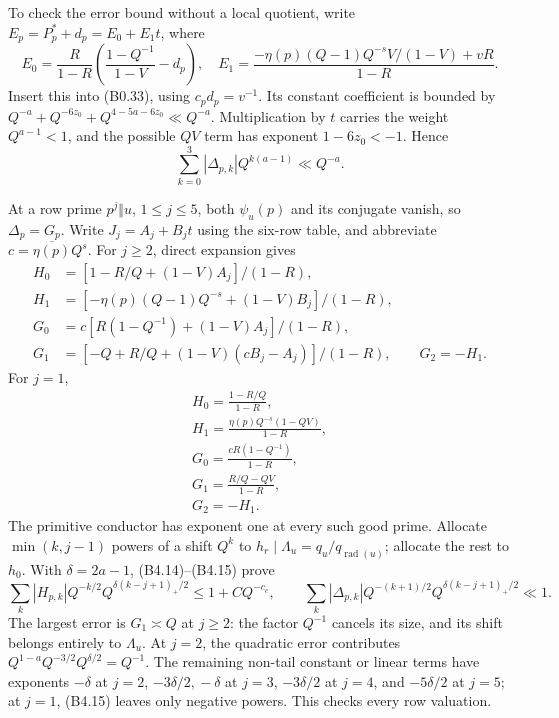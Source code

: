\documentclass[11pt,a4paper]{article}
\begin{document}
To check the error bound without a local quotient, write
\(E_p=P_p^*+d_p=E_0+E_1t\), where \[
E_0=\frac R{1-R}\left(\frac{1-Q^{-1}}{1-V}-d_p\right),\quad
E_1=\frac{-\eta(p)(Q-1)Q^{-s}V/(1-V)+vR}{1-R}.
\tag{B4.12}
\] Insert this into (B0.33), using \(c_pd_p=v^{-1}\). Its constant
coefficient is bounded by \(Q^{-a}+Q^{-6z_0}+Q^{4-5a-6z_0}\ll Q^{-a}\).
Multiplication by \(t\) carries the weight \(Q^{a-1}<1\), and the
possible \(QV\) term has exponent \(1-6z_0<-1\). Hence \[
\sum_{k=0}^3|\Delta_{p,k}|Q^{k(a-1)}\ll Q^{-a}.
\tag{B4.13}
\]

At a row prime \(p^j\Vert u\), \(1\le j\le5\), both \(\psi_u(p)\) and
its conjugate vanish, so \(\Delta_p=G_p\). Write \(J_j=A_j+B_jt\) using
the six-row table, and abbreviate \(c=\overline{\eta(p)}Q^s\). For
\(j\ge2\), direct expansion gives \[
\begin{aligned}
H_0&=[1-R/Q+(1-V)A_j]/(1-R),\\
H_1&=[-\eta(p)(Q-1)Q^{-s}+(1-V)B_j]/(1-R),\\
G_0&=c[R(1-Q^{-1})+(1-V)A_j]/(1-R),\\
G_1&=[-Q+R/Q+(1-V)(cB_j-A_j)]/(1-R),\qquad G_2=-H_1.
\end{aligned}
\tag{B4.14}
\] For \(j=1\), \[
\begin{gathered}
H_0=\frac{1-R/Q}{1-R},\\ H_1=\frac{\eta(p)Q^{-s}(1-QV)}{1-R},\\
G_0=\frac{cR(1-Q^{-1})}{1-R},\\ G_1=\frac{R/Q-QV}{1-R},\\ G_2=-H_1.
\end{gathered}
\tag{B4.15}
\] The primitive conductor has exponent one at every such good prime.
Allocate \(\min(k,\allowbreak{}j-1)\) powers of a shift \(Q^k\) to
\(h_r\mid\Lambda_u=q_u/q_{\operatorname{rad}(u)}\); allocate the rest to
\(h_0\). With \(\delta=2a-1\), (B4.14)--(B4.15) prove \[
\sum_k|H_{p,k}|Q^{-k/2}Q^{\delta(k-j+1)_+/2}\le1+CQ^{-c_e},\qquad
\sum_k|\Delta_{p,k}|Q^{-(k+1)/2}Q^{\delta(k-j+1)_+/2}\ll1.
\tag{B4.16}
\] The largest error is \(G_1\asymp Q\) at \(j\ge2\): the factor
\(Q^{-1}\) cancels its size, and its shift belongs entirely to
\(\Lambda_u\). At \(j=2\), the quadratic error contributes
\(Q^{1-a}Q^{-3/2}Q^{\delta/2}=Q^{-1}\). The remaining non-tail constant
or linear terms have exponents \(-\delta\) at \(j=2\),
\(-3\delta/2,\allowbreak{}-\delta\) at \(j=3\), \(-3\delta/2\) at \(j=4\), and
\(-5\delta/2\) at \(j=5\); at \(j=1\), (B4.15) leaves only negative
powers. This checks every row valuation.
\end{document}

